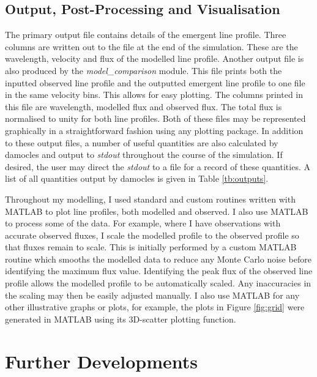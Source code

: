 \subsection{Output, Post-Processing and Visualisation}

The primary output file contains details of the emergent line profile.  Three columns are written out to the file at the end of the simulation.  These are the wavelength, velocity and flux of the modelled line profile.  Another output file is also produced by the \textit{model\_comparison} module.  This file prints both the inputted observed line profile and the outputted emergent line profile to one file in the same velocity bins.  This allows for easy plotting.  The columns printed in  this file are wavelength, modelled flux and observed flux. The total flux is normalised to unity for both line profiles.  Both of these files may be represented graphically in a straightforward fashion using any plotting package.  In addition to these output files, a number of useful quantities are also calculated by {\sc damocles} and output to \textit{stdout} throughout the course of the simulation.  If desired, the user may direct the \textit{stdout} to a file for a record of these quantities.  A list of all quantities output by {\sc damocles} is given in Table \ref{tb:outputs}.

Throughout my modelling, I used standard and custom routines written with MATLAB to plot line profiles, both modelled and observed.  I also use MATLAB to process some of the data.  For example, where I have observations with accurate observed fluxes, I scale the modelled profile to the observed profile so that fluxes remain to scale.  This is initially performed by a custom MATLAB routine which smooths the modelled data to reduce any Monte Carlo noise before identifying the maximum flux value.  Identifying the peak flux of the observed line profile allows the modelled profile to be automatically scaled.  Any inaccuracies in the scaling may then be easily adjusted manually.  I also use MATLAB for any other illustrative graphs or plots, for example, the plots in Figure \ref{fig:grid} were generated in MATLAB using its 3D-scatter plotting function.

\section{Further Developments}
\label{limitations}

